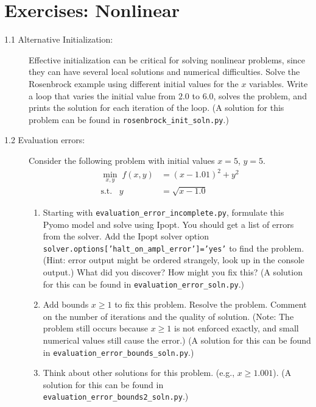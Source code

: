\documentclass[12pt]{article}
\begin{document}
\section*{Exercises: Nonlinear}

\begin{description}
\item[1.1 Alternative Initialization:] Effective initialization can be critical for solving nonlinear problems, since they can have several local solutions and numerical difficulties. Solve the Rosenbrock example using different initial values for the $x$ variables. Write a loop that varies the initial value
  from $2.0$ to $6.0$, solves the problem, and prints the solution for each iteration of the loop.
  (A solution for this problem can be found in {\tt rosenbrock\_init\_soln.py}.)

\item[1.2 Evaluation errors:] Consider the following problem with initial values $x{=}5$, $y{=}5$.
\begin{align*}
  \min_{x,y} \; f(x,y)&=(x-1.01)^2 + y^2 \\
  \mbox{s.t.} \;\;\; y &= \sqrt{x-1.0}
\end{align*}
\begin{enumerate}[label=(\alph*)]
\item Starting with {\tt evaluation\_error\_incomplete.py}, formulate this Pyomo model and solve using {\sc Ipopt}. You should get a list of errors from the solver. Add the {\sc Ipopt} solver option \\ {\tt solver.options['halt\_on\_ampl\_error']='yes'} to find the problem. (Hint: error output might be ordered strangely, look up in the console output.) What did you discover? How might you fix this? (A solution for this can be found in {\tt evaluation\_error\_soln.py}.)
\item Add bounds $x{\ge}1$ to fix this problem. Resolve the problem. Comment on the number of iterations and the quality of solution. (Note: The problem still occurs because $x\ge1$ is not enforced exactly, and small numerical values still cause the error.)
  (A solution for this can be found in {\tt evaluation\_error\_bounds\_soln.py}.)
\item Think about other solutions for this problem. (e.g., $x \ge 1.001$).
 (A solution for this can be found in {\tt evaluation\_error\_bounds2\_soln.py}.)
\end{enumerate}


\end{description}
\end{document}
